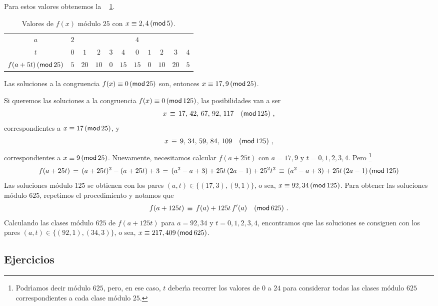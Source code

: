 \begin{ejemHensel}
	Para estos valores obtenemos la \tablename~%
	\ref{tab:hensel:cinco}.
	\begin{table}
		\centering
		\begin{tabular}{c|ccccc|ccccc}
			$a$ & $2$ & & & &
				& $4$ & & & & \\
			$t$ & $0$ & $1$ & $2$ & $3$ & $4$
				& $0$ & $1$ & $2$ & $3$ & $4$ \\
			$f(a+5t)\tmodulo[25]$ & $5$ & $20$ & $10$ & $0$ & $15$
				& $15$ & $0$ & $10$ & $20$ & $5$
		\end{tabular}
		\caption{
			Valores de $f(x)$ m\'odulo $25$ con
			$x\equiv 2,4\tmodulo[5]$.
		}\label{tab:hensel:cinco}
	\end{table}
	Las soluciones a la congruencia $f(x)\equiv 0\tmodulo[25]$
	son, entonces $x\equiv 17,9\tmodulo[25]$.

	Si queremos las soluciones a la congruencia
	$f(x)\equiv 0\tmodulo[125]$, las posibilidades van a ser
	\begin{displaymath}
		x\,\equiv\,17,\,42,\,67,\,92,\,117\modulo[125]
		\dispcomma
	\end{displaymath}
	correspondientes a $x\equiv 17\tmodulo[25]$, y
	\begin{displaymath}
		x\,\equiv\,9,\,34,\,59,\,84,\,109\modulo[125]
		\dispcomma
	\end{displaymath}
	correspondientes a $x\equiv 9\tmodulo[25]$.
	Nuevamente, necesitamos calcular $f(a+25t)$ con
	$a=17,9$ y $t=0,1,2,3,4$. Pero%
	\footnote{
		Podr\'{\i}amos decir m\'odulo $625$,
		pero, en ese caso, $t$ deber\'{\i}a recorrer
		los valores de $0$ a $24$ para considerar
		todas las clases m\'odulo $625$
		correspondientes a cada clase m\'odulo $25$.
	}
	\begin{displaymath}
		f(a+25t)\,=\,(a+25t)^2-(a+25t)+3\,=\,
			(a^2-a+3)+25t\,(2a-1)+25^2t^2\,\equiv\,
			(a^2-a+3)+25t\,(2a-1)\tmodulo[125]
	\end{displaymath}
	Las soluciones m\'odulo $125$ se obtienen con los pares
	$(a,t)\in\{(17,3),(9,1)\}$, o sea,
	$x\equiv 92,34\tmodulo[125]$.
	Para obtener las soluciones m\'odulo $625$, repetimos el
	procedimiento y notamos que
	\begin{displaymath}
		f(a+125t)\,\equiv\,f(a)+125t\,f'(a)\modulo[625]
		\dispstop
	\end{displaymath}
	Calculando las clases m\'odulo $625$ de $f(a+125t)$
	para $a=92,34$ y $t=0,1,2,3,4$, encontramos que las
	soluciones se consiguen con los pares
	$(a,t)\in\{(92,1),(34,3)\}$, o sea,
	$x\equiv 217,409\tmodulo[625]$.
\end{ejemHensel}

\subsection*{Ejercicios}


